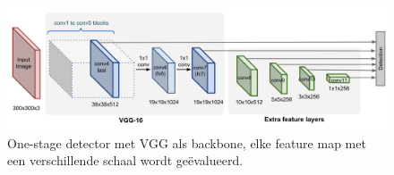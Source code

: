 \begin{figure}[!ht]
	\centering
	\includegraphics[width=0.80\linewidth]{fig/SSD.png}
	\caption{One-stage detector met VGG als backbone, elke feature map met een verschillende schaal wordt ge\"evalueerd.}
	\label{fig:ssd}
\end{figure}

